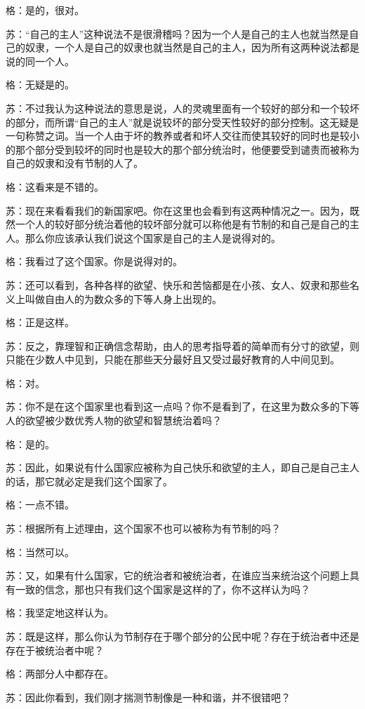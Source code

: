 \documentclass[12pt,oneside]{book}
\begin{document}
格：是的，很对。

苏：“自己的主人”这种说法不是很滑稽吗？因为一个人是自己的主人也就当然是自己的奴隶，一个人是自己的奴隶也就当然是自己的主人，因为所有这两种说法都是说的同一个人。

格：无疑是的。

苏：不过我认为这种说法的意思是说，人的灵魂里面有一个较好的部分和一个较坏的部分，而所谓“自己的主人”就是说较坏的部分受天性较好的部分控制。这无疑是一句称赞之词。当一个人由于坏的教养或者和坏人交往而使其较好的同时也是较小的那个部分受到较坏的同时也是较大的那个部分统治时，他便要受到谴责而被称为自己的奴隶和没有节制的人了。

格：这看来是不错的。

苏：现在来看看我们的新国家吧。你在这里也会看到有这两种情况之一。因为，既然一个人的较好部分统治着他的较坏部分就可以称他是有节制的和自己是自己的主人。那么你应该承认我们说这个国家是自己的主人是说得对的。

格：我看过了这个国家。你是说得对的。

苏：还可以看到，各种各样的欲望、快乐和苦恼都是在小孩、女人、奴隶和那些名义上叫做自由人的为数众多的下等人身上出现的。

格：正是这样。

苏：反之，靠理智和正确信念帮助，由人的思考指导着的简单而有分寸的欲望，则只能在少数人中见到，只能在那些天分最好且又受过最好教育的人中间见到。

格：对。

苏：你不是在这个国家里也看到这一点吗？你不是看到了，在这里为数众多的下等人的欲望被少数优秀人物的欲望和智慧统治着吗？

格：是的。

苏：因此，如果说有什么国家应被称为自己快乐和欲望的主人，即自己是自己主人的话，那它就必定是我们这个国家了。

格：一点不错。

苏：根据所有上述理由，这个国家不也可以被称为有节制的吗？

格：当然可以。

苏：又，如果有什么国家，它的统治者和被统治者，在谁应当来统治这个问题上具有一致的信念，那也只有我们这个国家是这样的了，你不这样认为吗？

格：我坚定地这样认为。

苏：既是这样，那么你认为节制存在于哪个部分的公民中呢？存在于统治者中还是存在于被统治者中呢？

格：两部分人中都存在。

苏：因此你看到，我们刚才揣测节制像是一种和谐，并不很错吧？
\end{document}
